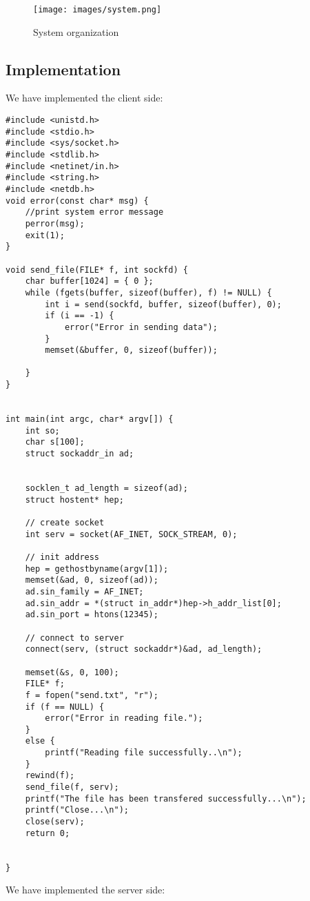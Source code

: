 \documentclass[13pt]{article}
\begin{document}
\begin{figure}[H]
    \centering
    \texttt{[image: images/system.png]}
    \caption{System organization}
\end{figure}

\subsection{Implementation}
\noindent%
We have implemented the client side:

\begin{verbatim}
#include <unistd.h>
#include <stdio.h>
#include <sys/socket.h>
#include <stdlib.h>
#include <netinet/in.h>
#include <string.h>
#include <netdb.h>
void error(const char* msg) {
	//print system error message
	perror(msg);
	exit(1);
}

void send_file(FILE* f, int sockfd) {
	char buffer[1024] = { 0 };
	while (fgets(buffer, sizeof(buffer), f) != NULL) {
		int i = send(sockfd, buffer, sizeof(buffer), 0);
		if (i == -1) {
			error("Error in sending data");
		}
		memset(&buffer, 0, sizeof(buffer));

	}
}


int main(int argc, char* argv[]) {
	int so;
	char s[100];
	struct sockaddr_in ad;


	socklen_t ad_length = sizeof(ad);
	struct hostent* hep;

	// create socket
	int serv = socket(AF_INET, SOCK_STREAM, 0);

	// init address
	hep = gethostbyname(argv[1]);
	memset(&ad, 0, sizeof(ad));
	ad.sin_family = AF_INET;
	ad.sin_addr = *(struct in_addr*)hep->h_addr_list[0];
	ad.sin_port = htons(12345);

	// connect to server
	connect(serv, (struct sockaddr*)&ad, ad_length);

	memset(&s, 0, 100);
	FILE* f;
	f = fopen("send.txt", "r");
	if (f == NULL) {
		error("Error in reading file.");
	}
	else {
		printf("Reading file successfully..\n");
	}
	rewind(f);
	send_file(f, serv);
	printf("The file has been transfered successfully...\n");
	printf("Close...\n");
	close(serv);
	return 0;


}

\end{verbatim}
\noindent%
We have implemented the server side:
\end{document}
